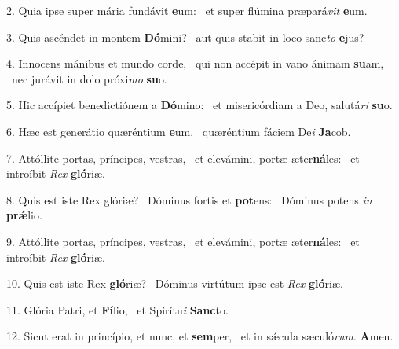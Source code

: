 2. Quia ipse super mária fundávit \textbf{e}um: \ast\  et super flúmina præpará\textit{vit} \textbf{e}um.\

3. Quis ascéndet in montem \textbf{Dó}mini? \ast\  aut quis stabit in loco sanc\textit{to} \textbf{e}jus?\

4. Innocens mánibus et mundo corde, \dag\  qui non accépit in vano ánimam \textbf{su}am, \ast\  nec jurávit in dolo próxi\textit{mo} \textbf{su}o.\

5. Hic accípiet benedictiónem a \textbf{Dó}mino: \ast\  et misericórdiam a Deo, salutá\textit{ri} \textbf{su}o.\

6. Hæc est generátio quæréntium \textbf{e}um, \ast\  quæréntium fáciem De\textit{i} \textbf{Ja}cob.\

7. Attóllite portas, príncipes, vestras, \dag\  et elevámini, portæ æter\textbf{ná}les: \ast\  et introíbit \textit{Rex} \textbf{gló}riæ.\

8. Quis est iste Rex glóriæ? \dag\  Dóminus fortis et \textbf{pot}ens: \ast\  Dóminus potens \textit{in} \textbf{prǽ}lio.\

9. Attóllite portas, príncipes, vestras, \dag\  et elevámini, portæ æter\textbf{ná}les: \ast\  et introíbit \textit{Rex} \textbf{gló}riæ.\

10. Quis est iste Rex \textbf{gló}riæ? \ast\  Dóminus virtútum ipse est \textit{Rex} \textbf{gló}riæ.\

11. Glória Patri, et \textbf{Fí}lio, \ast\  et Spirítu\textit{i} \textbf{Sanc}to.\

12. Sicut erat in princípio, et nunc, et \textbf{sem}per, \ast\  et in sǽcula sæculó\textit{rum}. \textbf{A}men.\

